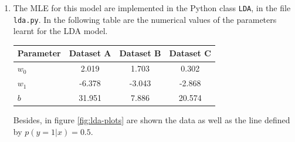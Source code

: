 \documentclass[a4paper, 11pt]{article}
\begin{document}
\begin{enumerate}[label=\alph*]
    \item The MLE for this model are implemented in the Python class \texttt{LDA}, in the file \texttt{lda.py}. In the following table are the numerical values of the parameters learnt for the LDA model. \\

        \begin{tabular}{ | l || *{3}{c| } }
             \hline
                Parameter & Dataset A & Dataset B & Dataset C \\
             \hline
               $w_0$ & 2.019 & 1.703 & 0.302 \\
               $w_1$ & -6.378 & -3.043 & -2.868 \\
               $b$ & 31.951 & 7.886 & 20.574 \\
             \hline  
         \end{tabular}
         \vspace*{.6em}

    Besides, in figure \ref{fig:lda-plots} are shown the data as well as the line defined by $p \left( y = 1 | x \right) = 0.5$.


\end{enumerate}
\end{document}
